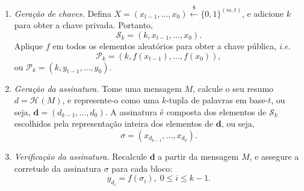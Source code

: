 \documentclass{ufsctex/ufsctex}
\newcommand{\pk}{\mathcal{P}_{k}}
\newcommand{\sk}{\mathcal{S}_{k}}
\newcommand{\hash}[2][]{\mathcal{H}^{#1} (#2)}
\newcommand{\binwds}[1]{\{0, 1\}^{#1}}
\newcommand{\random}{\stackrel{\$}{\longleftarrow}}
\begin{document}
\begin{enumerate}

  \item[] \emph{Geração de chaves.} Defina $X = (x_{t - 1}, \dots, x_{0})
      \random{} \binwds{(m, t)}$, e adicione $k$ para obter a chave privada.
        Portanto,
        \begin{equation}
          \sk{} = (k, x_{t - 1}, \dots, x_{0}).
        \end{equation}
        Aplique $f$ em todos os elementos aleatórios para obter a chave
        pública, \emph{i.e.}
        \begin{equation}
          \pk{} = (k, f(x_{t - 1}), \dots, f(x_{0})),
        \end{equation}
        ou $\pk{} = (k, y_{t - 1}, \dots, y_{0})$.

  \item[] \emph{Geração da assinatura.} Tome uma mensagem $M$, calcule o seu
      resumo $d = \hash{M}$, e represente-o como uma $k$-tupla de palavras em
        base-$t$, ou seja, $\mathbf{d} = (d_{k - 1}, \dots, d_{0})$. A
        assinatura é composta dos elementos de $\sk{}$ escolhidos pela
        representação inteira dos elementos de $\mathbf{d}$, ou seja,
        \begin{equation}
          \sigma = (x_{d_{k - 1}}, \dots, x_{d_{0}}).
        \end{equation}

  \item[] \emph{Verificação da assinatura.} Recalcule $\mathbf{d}$ a partir da
      mensagem $M$, e assegure a corretude da assinatura $\sigma$ para cada
        bloco:
        \begin{equation}
          y_{d_{i}} = f(\sigma_{i}), \; 0 \leq i \leq k - 1.
        \end{equation}

\end{enumerate}
\end{document}
